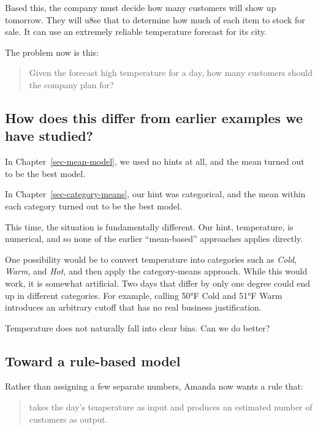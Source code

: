 \documentclass[
  12pt,
  letterpaper,
  DIV=11,
  numbers=noendperiod]{scrreprt}
\begin{document}
Based this, the company must decide how many customers will show up
tomorrow. They will u8se that to determine how much of each item to
stock for sale. It can use an extremely reliable temperature forecast
for its city.

The problem now is this:

\begin{quote}
Given the forecast high temperature for a day, how many customers should
the company plan for?
\end{quote}

\subsection{How does this differ from earlier examples we have
studied?}\label{how-does-this-differ-from-earlier-examples-we-have-studied}

In Chapter~\ref{sec-mean-model}, we used no hints at all, and the mean
turned out to be the best model.

In Chapter~\ref{sec-category-means}, our hint was categorical, and the
mean within each category turned out to be the best model.

This time, the situation is fundamentally different. Our hint,
temperature, is numerical, and so none of the earlier ``mean-based''
approaches applies directly.

One possibility would be to convert temperature into categories such as
\emph{Cold}, \emph{Warm}, and \emph{Hot}, and then apply the
category-means approach. While this would work, it is somewhat
artificial. Two days that differ by only one degree could end up in
different categories. For example, calling 50°F Cold and 51°F Warm
introduces an arbitrary cutoff that has no real business justification.

Temperature does not naturally fall into clear bins. Can we do better?

\subsection{Toward a rule-based model}\label{toward-a-rule-based-model}

Rather than assigning a few separate numbers, Amanda now wants a rule
that:

\begin{quote}
takes the day's temperature as input and produces an estimated number of
customers as output.
\end{quote}
\end{document}
